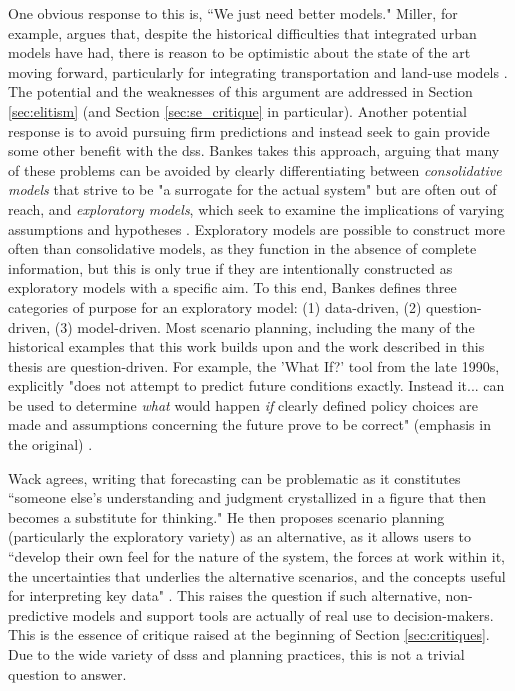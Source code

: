 One obvious response to this is, ``We just need better models." Miller, for example, argues that, despite the historical difficulties that integrated urban models have had, there is reason to be optimistic about the state of the art moving forward, particularly for integrating transportation and land-use models \cite{millerIntegratedUrbanModeling2018}. The potential and the weaknesses of this argument are addressed in Section \ref{sec:elitism} (and Section \ref{sec:se_critique} in particular). Another potential response is to avoid pursuing firm predictions and instead seek to gain provide some other benefit with the \ac{dss}. Bankes takes this approach, arguing that many of these problems can be avoided by clearly differentiating between \textit{consolidative models} that strive to be "a surrogate for the actual system" but are often out of reach, and \textit{exploratory models}, which seek to examine the implications of varying assumptions and hypotheses \cite{bankesExploratoryModelingPolicy1993}. Exploratory models are possible to construct more often than consolidative models, as they function in the absence of complete information, but this is only true if they are intentionally constructed as exploratory models with a specific aim.  To this end, Bankes defines three categories of purpose for an exploratory model: (1) data-driven, (2) question-driven, (3) model-driven. Most scenario planning, including the many of the historical examples that this work builds upon and the work described in this thesis are question-driven. For example, the 'What If?' tool from the late 1990s, explicitly "does not attempt to predict future conditions exactly. Instead it... can be used to determine \textit{what} would happen \textit{if} clearly defined policy choices are made and assumptions concerning the future prove to be correct" (emphasis in the original) \cite{klostermanWhatIfCollaborative1999}.

Wack agrees, writing that forecasting can be problematic as it constitutes ``someone else's understanding and judgment crystallized in a figure that then becomes a substitute for thinking." He then proposes scenario planning (particularly the exploratory variety) as an alternative, as it allows users to ``develop their own feel for the nature of the system, the forces at work within it, the uncertainties that underlies the alternative scenarios, and the concepts useful for interpreting key data" \cite{wackScenariosShootingRapids1985}. This raises the question if such alternative, non-predictive models and support tools are actually of real use to decision-makers. This is the essence of critique raised at the beginning of Section \ref{sec:critiques}. Due to the wide variety of \acp{dss} and planning practices, this is not a trivial question to answer.

